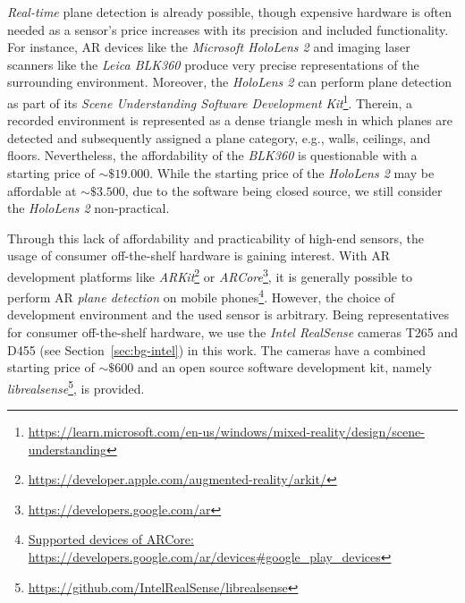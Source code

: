 \documentclass[main.tex]{subfiles}
\begin{document}
\textit{Real-time} plane detection is already possible, though expensive hardware is often needed as a sensor's price increases
with its precision and included functionality.
For instance, AR devices like the \textit{Microsoft HoloLens 2} and imaging laser scanners like the \textit{Leica BLK360} produce very precise representations of the surrounding environment.
Moreover, the \textit{HoloLens 2} can perform plane detection as part of its \textit{Scene Understanding Software Development Kit}\footnote{\href{https://learn.microsoft.com/en-us/windows/mixed-reality/design/scene-understanding}{https://learn.microsoft.com/en-us/windows/mixed-reality/design/scene-understanding}}. Therein, a recorded environment is represented as a dense triangle mesh in which planes are detected and subsequently assigned a plane category, e.g., walls, ceilings, and floors.
Nevertheless, the affordability of the \textit{BLK360} is questionable with a starting price of ${\sim}\$19.000$. While the starting price of the \textit{HoloLens 2} may be affordable at ${\sim}\$3.500$, due to the software being closed source, we still consider the \textit{HoloLens 2} non-practical.

Through this lack of affordability and practicability of high-end sensors, the usage of consumer off-the-shelf hardware is gaining interest.
With AR development platforms like \textit{ARKit}\footnote{\href{https://developer.apple.com/augmented-reality/arkit/}{https://developer.apple.com/augmented-reality/arkit/}} or \textit{ARCore}\footnote{\href{https://developers.google.com/ar}{https://developers.google.com/ar}}, it is generally possible to perform AR \textit{plane detection} on mobile phones\footnote{\href{https://developers.google.com/ar/devices\#google\_play\_devices}{Supported devices of ARCore: https://developers.google.com/ar/devices\#google\_play\_devices}}. However, the choice of development environment and the used sensor is arbitrary.
Being representatives for consumer off-the-shelf hardware, we use the \textit{Intel RealSense} cameras T265 and D455 (see Section~\ref{sec:bg-intel}) in this work. The cameras have a combined starting price of ${\sim}\$600$ and an open source software development kit, namely \textit{librealsense}\footnote{\href{https://github.com/IntelRealSense/librealsense}{https://github.com/IntelRealSense/librealsense}}, is provided.
\end{document}
